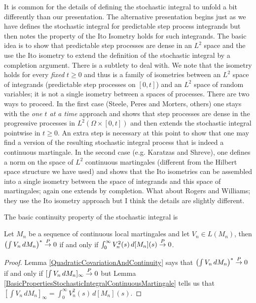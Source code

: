 It is common for the details of defining the stochastic integral to unfold a bit differently than our presentation.  The alternative presentation begins just as we have defines the stochastic integral for predictable step process integrands but then notes the property of the Ito Isometry holds for such integrands.  The basic idea is to show that predictable step processes are dense in an $L^2$ space and the use the Ito isometry to extend the definition of the stochastic integral by a completion argument.  There is a subtlety to deal with.  We note that the isometry holds for every \emph{fixed} $t \geq 0$ and thus is a family of isometries between an $L^2$ space of integrands (predictable step processes on $[0,t]$) and an $L^2$ space of random variables; it is not a single isometry between a spaces of processes.  There are two ways to proceed.  In the first case (Steele, Peres and Morters, others) one stays with the \emph{one $t$ at a time} approach and shows that step processes are dense in the progressive processes in $L^2(\Omega \times [0,t])$ and then extends the stochastic integral pointwise in $t \geq 0$.  An extra step is necessary at this point to show that one may find a version of the resulting stochastic integral process that is indeed a continuous martingale.  In the second case (e.g. Karatzas and Shreve), one defines a norm on the space of $L^2$ continuous martingales (different from the Hilbert space structure we have used) and shows that the Ito isometries can be assembled into a single isometry between the space of integrands and this space of martingales; again one extends by completion.  What about Rogers and Williams; they use the Ito isometry approach but I think the details are slightly different.
 
The basic continuity property of the stochastic integral is
\begin{lem}\label{LimitsOfStochasticIntegralContinuousLocalMartingale}Let $M_n$ be a sequence of continuous local martingales and let $V_n \in L(M_n)$, then 
$\left( \int V_n \, dM_n \right)^* \overset{P}\to 0$ if and only if $\int_0^\infty V_n^2(s) \, d[M_n](s) \overset{P}\to 0$.
\end{lem}
\begin{proof}
Lemma \ref{QuadraticCovariationAndContinuity} says that $\left( \int V_n \, dM_n \right)^* \overset{P}\to 0$ if and only if $[\int V_n \, dM_n]_\infty \overset{P}\to 0$ but Lemma \ref{BasicPropertiesStochasticIntegralContinuousMartingale} tells us that $[\int V_n \, dM_n]_\infty = \int_0^\infty V^2_n(s) \, d[M_n](s)$. 
\end{proof}


